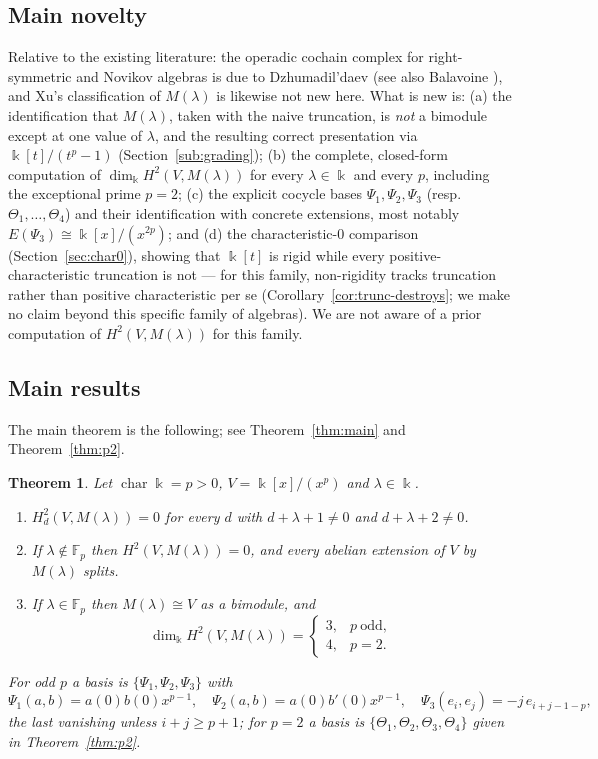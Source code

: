\documentclass[11pt,reqno]{amsart}
\theoremstyle{plain}
\newtheorem{theorem}{Theorem}[section]
\theoremstyle{definition}
\newcommand{\kk}{\Bbbk}
\newcommand{\Ht}{H^2}
\newcommand{\Fp}{\mathbb{F}_p}
\begin{document}
\subsection{Main novelty}\label{sub:novelty}
Relative to the existing literature: the operadic cochain complex for right-symmetric and
Novikov algebras is due to Dzhumadil'daev \cite{Dzhu1999} (see also Balavoine
\cite{Balavoine1997,Balavoine1998}), and Xu's classification of $M(\lambda)$
\cite{Xu1996} is likewise not new here. What is new is: (a) the identification that
$M(\lambda)$, taken with the naive truncation, is \emph{not} a bimodule except at one value
of $\lambda$, and the resulting correct presentation via $\kk[t]/(t^p-1)$
(Section~\ref{sub:grading}); (b) the complete, closed-form computation of
$\dim_\kk\Ht(V,M(\lambda))$ for every $\lambda\in\kk$ and every $p$, including the
exceptional prime $p=2$; (c) the explicit cocycle bases $\Psi_1,\Psi_2,\Psi_3$ (resp.\
$\Theta_1,\dots,\Theta_4$) and their identification with concrete extensions, most notably
$E(\Psi_3)\cong\kk[x]/(x^{2p})$; and (d) the characteristic-$0$ comparison
(Section~\ref{sec:char0}), showing that $\kk[t]$ is rigid while every positive-characteristic
truncation is not --- for this family, non-rigidity tracks truncation rather than positive
characteristic per se (Corollary~\ref{cor:trunc-destroys}; we make no claim beyond this
specific family of algebras). We are not aware of a prior computation of $\Ht(V,M(\lambda))$
for this family.

\subsection{Main results}
The main theorem is the following; see Theorem~\ref{thm:main} and Theorem~\ref{thm:p2}.

\begin{theorem}\label{thm:intro}
Let $\operatorname{char}\kk=p>0$, $V=\kk[x]/(x^p)$ and $\lambda\in\kk$.
\begin{enumerate}[label=\textup{(\roman*)}]
\item $\Ht_d(V,M(\lambda))=0$ for every $d$ with $d+\lambda+1\ne0$ and $d+\lambda+2\ne0$.
\item If $\lambda\notin\Fp$ then $\Ht(V,M(\lambda))=0$, and every abelian extension of $V$
by $M(\lambda)$ splits.
\item If $\lambda\in\Fp$ then $M(\lambda)\cong V$ as a bimodule, and
\[
\dim_\kk\Ht(V,M(\lambda))=\begin{cases}3,& p\ \text{odd},\\ 4,& p=2 .\end{cases}
\]
\end{enumerate}
For odd $p$ a basis is $\{\Psi_1,\Psi_2,\Psi_3\}$ with
\[
\Psi_1(a,b)=a(0)b(0)x^{p-1},\quad \Psi_2(a,b)=a(0)b'(0)x^{p-1},\quad
\Psi_3(e_i,e_j)=-j\,e_{i+j-1-p},
\]
the last vanishing unless $i+j\ge p+1$; for $p=2$ a basis is $\{\Theta_1,\Theta_2,\Theta_3,
\Theta_4\}$ given in Theorem~\ref{thm:p2}.
\end{theorem}
\end{document}
